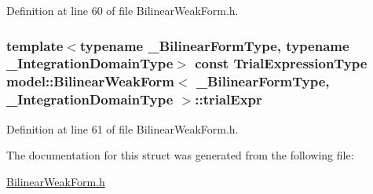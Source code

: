 Definition at line 60 of file Bilinear\+Weak\+Form.\+h.

\hypertarget{structmodel_1_1_bilinear_weak_form_a324cf51d42de687de79e445da265bab4}{}
\subsubsection[{trial\+Expr}]{\setlength{\rightskip}{0pt plus 5cm}template$<$typename \+\_\+\+Bilinear\+Form\+Type, typename \+\_\+\+Integration\+Domain\+Type$>$ const {\bf Trial\+Expression\+Type} {\bf model\+::\+Bilinear\+Weak\+Form}$<$ \+\_\+\+Bilinear\+Form\+Type, \+\_\+\+Integration\+Domain\+Type $>$\+::trial\+Expr}\label{structmodel_1_1_bilinear_weak_form_a324cf51d42de687de79e445da265bab4}


Definition at line 61 of file Bilinear\+Weak\+Form.\+h.



The documentation for this struct was generated from the following file\+:\begin{DoxyCompactItemize}
\item 
\hyperlink{_bilinear_weak_form_8h}{Bilinear\+Weak\+Form.\+h}\end{DoxyCompactItemize}
